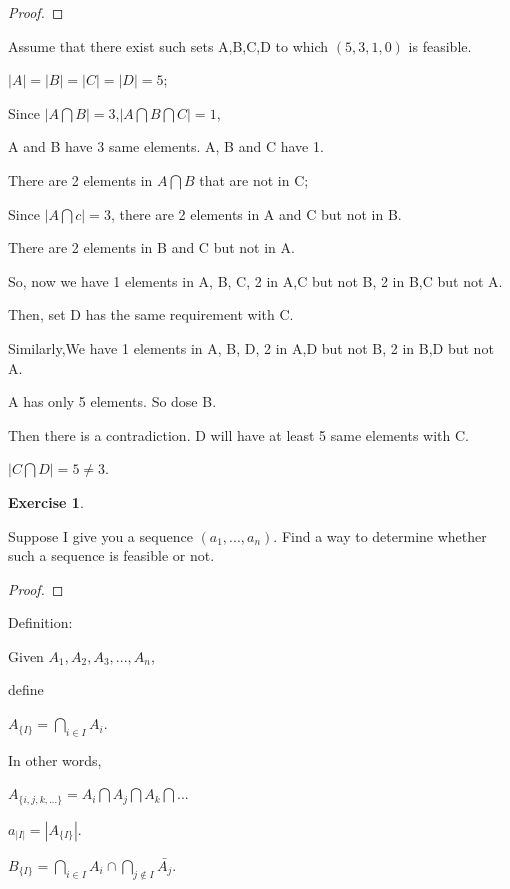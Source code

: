 \documentclass[12pt,a4]{article}
\newtheorem{exercise}[theorem]{Exercise}
\begin{document}
\begin{proof}
\end{proof}

Assume that there exist such sets A,B,C,D to which $(5,3,1,0)$ is feasible.

$|A|=|B|=|C|=|D|=5$;

Since $|A\bigcap B|=3$,$|A\bigcap B\bigcap C|=1$,

A and B have 3 same elements. A, B and C have 1.

There are 2 elements in $A\bigcap B$ that are not in C;

Since $|A\bigcap c|=3$, there are 2 elements in A and C but not in B.

There are 2 elements in B and C but not in A.

So, now we have 1 elements in A, B, C, 2 in A,C but not B, 2 in B,C but not A.

Then, set D has the same requirement with C.

Similarly,We have 1 elements in A, B, D, 2 in A,D but not B, 2 in B,D but not A.

A has only 5 elements. So dose B.

Then there is a contradiction. D will have at least 5 same elements with C.

$|C\bigcap D|=5\not = 3$.

\begin{exercise}
\end{exercise}
	Suppose I give you a sequence $(a_1,...,a_n)$. Find a way to determine whether such a sequence is feasible or not.

\begin{proof}
\end{proof}

 Definition: 
 
     Given $A_1,A_2,A_3,...,A_n$, 
     
     define 
     \begin{center}
      $A_{\{I\}}=\bigcap \limits_{i \in I} A_i $. 
     \end{center} 
     In other words, 
     \begin{center}
      $A_{\{i,j,k,...\}}= A_i \bigcap A_j \bigcap A_k \bigcap ...$
     \end{center}
     
     \begin{center}
      $a_{|I|}=|A_{\{I\}}|.$
     
      $B_{\{I\}}=\bigcap \limits_{i \in I} A_i \cap \bigcap \limits_{j\notin I } \bar{A_j}$.
     \end{center}
     
\end{document}
